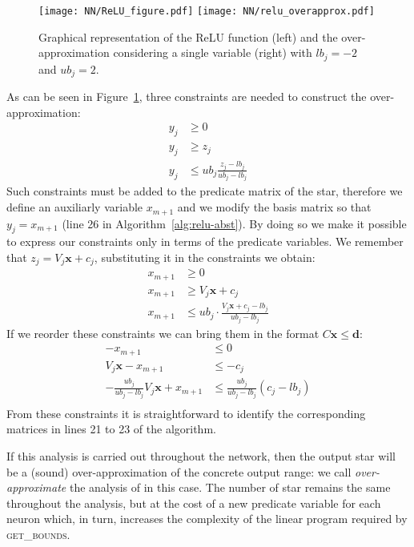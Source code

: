 \begin{figure}
	\centering
	\caption{\label{fig:relu-overapprox} Graphical representation
		of the ReLU function (left) and the over-approximation 
		considering a single variable (right) with $lb_{j} = -2$ 
		and $ub_{j} = 2$.}
	\texttt{[image: NN/ReLU\_figure.pdf]}
	\hspace*{\fill}
	\texttt{[image: NN/relu\_overapprox.pdf]}
\end{figure}

As can be seen in Figure~\ref{fig:relu-overapprox}, three constraints
are needed to construct the over-approximation:
\begin{align*}
y_j &\geq 0\\
y_j &\geq z_j\\
y_j &\leq ub_j \frac{z_j - lb_j}{ub_j - lb_j}
\end{align*}
Such constraints must be added to the predicate matrix of the star, 
therefore we define an auxiliarly variable $x_{m+1}$ and we modify 
the basis matrix so that $y_j = x_{m+1}$ (line 26 in 
Algorithm~\ref{alg:relu-abst}). By doing so we make it possible to 
express our constraints only in terms of the predicate variables.
We remember that $z_j = V_j \mathbf{x} + c_j$, substituting it in 
the constraints we obtain:
\begin{align*}
x_{m+1} &\geq 0\\
x_{m+1} &\geq V_j \mathbf{x} + c_j\\
x_{m+1} &\leq ub_j \cdot \frac{V_j \mathbf{x} + c_j - lb_j}{ub_j - lb_j}
\end{align*}
If we reorder these constraints we can bring them in the format
$C\mathbf{x} \leq \mathbf{d}$:
\begin{align*}
- x_{m+1} &\leq 0\\
V_j \mathbf{x} - x_{m+1} &\leq -c_j\\
- \frac{ub_j}{ub_j-lb_j} V_j \mathbf{x} + x_{m+1} &\leq \frac{ub_j}{ub_j-lb_j}(c_j - lb_j)\\
\end{align*}
From these constraints it is straightforward to identify the 
corresponding matrices in lines 21 to 23 of the algorithm.

If this analysis is carried out throughout the network, then the 
output star will be a (sound) over-approximation of the concrete output 
range: we call \textit{over-approximate} the analysis of \nevertwo{} 
in this case. The number of star remains the same throughout
the analysis, but at the cost of a new predicate variable for each neuron
which, in turn, increases the complexity of the linear program required
by \textsc{get\_bounds}.

